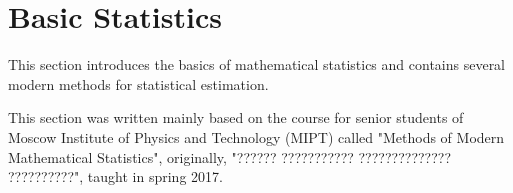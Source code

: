 \section{Basic Statistics}
\par This section introduces the basics of mathematical statistics and contains several modern methods for statistical estimation. 
\par This section was written mainly based on the course for senior students of Moscow Institute of Physics and Technology (MIPT) called "Methods of Modern Mathematical Statistics", originally, "?????? ??????????? ?????????????? ??????????", taught in spring 2017.